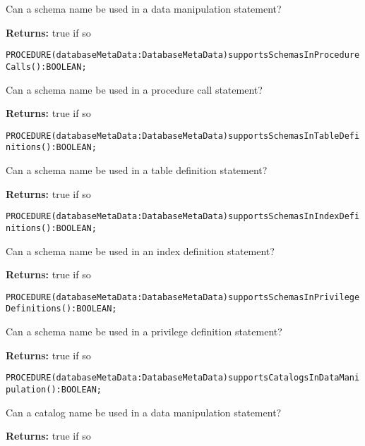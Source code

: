 Can a schema name be used in a data manipulation statement? 


{\bf Returns: } 
true if so 




\verb'PROCEDURE(databaseMetaData:DatabaseMetaData)supportsSchemasInProcedureCalls():BOOLEAN;'






Can a schema name be used in a procedure call statement? 


{\bf Returns: } 
true if so 




\verb'PROCEDURE(databaseMetaData:DatabaseMetaData)supportsSchemasInTableDefinitions():BOOLEAN;'






Can a schema name be used in a table definition statement? 


{\bf Returns: } 
true if so 




\verb'PROCEDURE(databaseMetaData:DatabaseMetaData)supportsSchemasInIndexDefinitions():BOOLEAN;'






Can a schema name be used in an index definition statement? 


{\bf Returns: } 
true if so 




\verb'PROCEDURE(databaseMetaData:DatabaseMetaData)supportsSchemasInPrivilegeDefinitions():BOOLEAN;'






Can a schema name be used in a privilege definition statement? 


{\bf Returns: } 
true if so 




\verb'PROCEDURE(databaseMetaData:DatabaseMetaData)supportsCatalogsInDataManipulation():BOOLEAN;'






Can a catalog name be used in a data manipulation statement? 


{\bf Returns: } 
true if so 




